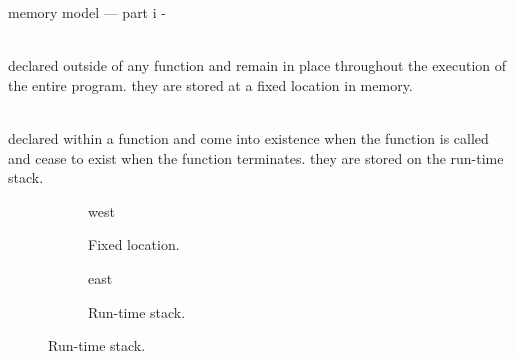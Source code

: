 \documentclass[10pt,t,svgnames]{beamer}
\makeatletter
\newlength\tightleftmargin{}
\newlength\diffleftmargin{}
\providecommand{\nextline}{
  \setlength\labelwidth{\tightleftmargin}
  \setlength\leftmargin{\tightleftmargin}
  \advance\linewidth\diffleftmargin{}
  \advance\@totalleftmargin-\diffleftmargin{}
  \parshape\@ne\@totalleftmargin\linewidth{}
  \setlength\itemsep{1.5ex}
}
\let\origdescription\description
\let\endorigdescription\enddescription
\renewenvironment{description}{\origdescription\nextline}{\endorigdescription}
\makeatother
\begin{document}
  \begin{frame}{memory model --- part i}
    \begin{description}
      \item[global variables] \hfill \\ declared outside of any function and
        remain in place throughout the execution of the entire program. they are
        stored at a fixed location in memory.
      \item[local variables] \hfill \\ declared within a function and come into
        existence when the function is called and cease to exist when the
        function terminates. they are stored on the run-time stack.
    \end{description}

    \vspace{1\baselineskip}

    \begin{figure}
      \centering
      \begin{subfigure}[b]{.30\textwidth}
        \centering
        \begin{tikzstack}[bg]
          \begin{stack}{west}
          \end{stack}
        \end{tikzstack}
        \caption{Fixed location.}
      \end{subfigure}
      \quad
      \begin{subfigure}[b]{.30\textwidth}
        \centering
        \begin{tikzstack}[fg]
          \begin{stack}{east}
          \end{stack}
        \end{tikzstack}
        \caption{Run-time stack.}
      \end{subfigure}
    \end{figure}

\end{frame}
\end{document}
